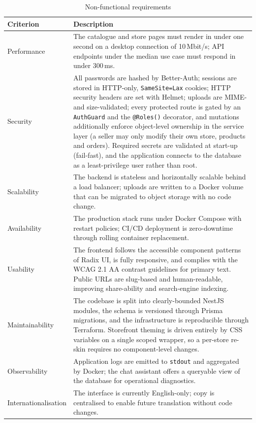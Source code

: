 \documentclass[12pt, a4paper, oneside]{report}
\begin{document}
\begin{table}[H]
  \centering
  \caption{Non-functional requirements}
  \begin{tabularx}{\textwidth}{lX}
    \toprule
    \textbf{Criterion}  & \textbf{Description} \\
    \midrule
    Performance      & The catalogue and store pages must render in under one second on a desktop connection of 10\,Mbit/s; API endpoints under the median use case must respond in under 300\,ms. \\
    Security         & All passwords are hashed by Better-Auth; sessions are stored in HTTP-only, \texttt{SameSite=Lax} cookies; HTTP security headers are set with Helmet; uploads are MIME- and size-validated; every protected route is gated by an \texttt{AuthGuard} and the \texttt{@Roles()} decorator, and mutations additionally enforce object-level ownership in the service layer (a seller may only modify their own store, products and orders). Required secrets are validated at start-up (fail-fast), and the application connects to the database as a least-privilege user rather than root. \\
    Scalability      & The backend is stateless and horizontally scalable behind a load balancer; uploads are written to a Docker volume that can be migrated to object storage with no code change. \\
    Availability     & The production stack runs under Docker Compose with restart policies; CI/CD deployment is zero-downtime through rolling container replacement. \\
    Usability        & The frontend follows the accessible component patterns of Radix UI, is fully responsive, and complies with the WCAG 2.1 AA contrast guidelines for primary text. Public URLs are slug-based and human-readable, improving share-ability and search-engine indexing. \\
    Maintainability  & The codebase is split into clearly-bounded NestJS modules, the schema is versioned through Prisma migrations, and the infrastructure is reproducible through Terraform. Storefront theming is driven entirely by CSS variables on a single scoped wrapper, so a per-store re-skin requires no component-level changes. \\
    Observability    & Application logs are emitted to \texttt{stdout} and aggregated by Docker; the chat assistant offers a queryable view of the database for operational diagnostics. \\
    Internationalisation & The interface is currently English-only; copy is centralised to enable future translation without code changes. \\
    \bottomrule
  \end{tabularx}
  \label{tab:nfr}
\end{table}
\end{document}
